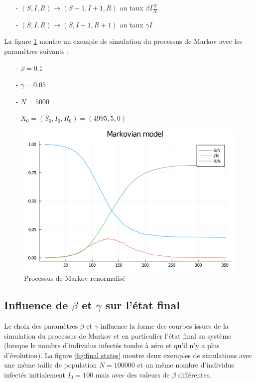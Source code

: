 \documentclass[12pt]{extarticle}
\begin{document}
\begin{itemize}
    \item[-] $(S, I, R) \rightarrow (S-1, I+1, R)$ au taux $\beta I \frac{S}{N}$
    \item[-] $(S, I, R) \rightarrow (S, I-1, R+1)$ au taux $\gamma I$
\end{itemize}

La figure \ref{fig:markovian} montre un exemple de simulation du processus de Markov avec les paramètres suivants : 
\begin{itemize}
    \item[-] $\beta = 0.1$
    \item[-] $\gamma = 0.05$
    \item[-] $N = 5000$ 
    \item[-] $X_0 = (S_0, I_0, R_0) = (4995, 5, 0)$ 
\end{itemize}

\begin{figure}[h!]
    \begin{center}
        \includegraphics[width=0.5\linewidth]{figures/markovian.png}
        \caption{Processus de Markov renormalisé}
        \label{fig:markovian}
    \end{center}
\end{figure}

\subsection{Influence de $\beta$ et $\gamma$ sur l'état final}

Le choix des paramètres $\beta$ et $\gamma$ influence la forme des courbes issues de la simulation du processus de Markov et en particulier l'état final su système (lorsque le nombre d'individus infectés tombe à zéro et qu'il n'y a plus d'évolution).
La figure \ref{fig:final states} montre deux exemples de simulations avec une même taille de population $N = 100000$ et un même nombre d'individus infectés initialement $I_0 = 100$ mais avec des valeurs de $\beta$ différentes. 
\end{document}
